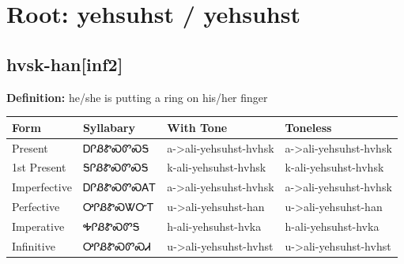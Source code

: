 \documentclass{article}%
\begin{document}
%
\normalsize%
\section*{Root: yehsuhst / yehsuhst}%
\subsection*{hvsk-han[inf2]}%
\textbf{Definition: }%
he/she is putting a ring on his/her finger%
\\[0.5em]%
\begin{tabular}{|l|l|l|l|}%
\hline%
\textbf{Form}&\textbf{Syllabary}&\textbf{With Tone}&\textbf{Toneless}\\%
\hline%
Present&ᎠᎵᏰᏑᏍᏛᏍᎦ&a{-}>ali{-}yehsuhst{-}hvhsk&a{-}>ali{-}yehsuhst{-}hvhsk\\%
1st Present&ᎦᎵᏰᏑᏍᏛᏍᎦ&k{-}ali{-}yehsuhst{-}hvhsk&k{-}ali{-}yehsuhst{-}hvhsk\\%
Imperfective&ᎠᎵᏰᏑᏍᏛᏍᎪᎢ&a{-}>ali{-}yehsuhst{-}hvhsk&a{-}>ali{-}yehsuhst{-}hvhsk\\%
Perfective&ᎤᎵᏰᏑᏍᏔᏅᎢ&u{-}>ali{-}yehsuhst{-}han&u{-}>ali{-}yehsuhst{-}han\\%
Imperative&ᎭᎵᏰᏑᏍᏛᎦ&h{-}ali{-}yehsuhst{-}hvka&h{-}ali{-}yehsuhst{-}hvka\\%
Infinitive&ᎤᎵᏰᏑᏍᏛᏍᏗ&u{-}>ali{-}yehsuhst{-}hvhst&u{-}>ali{-}yehsuhst{-}hvhst\\%
\hline%
\end{tabular}%
\\[1em]%
\end{document}
